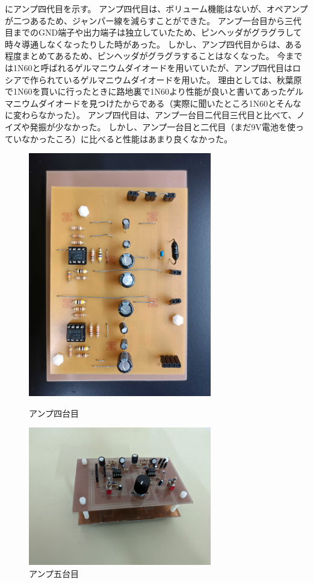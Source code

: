 \documentclass[report.tex]{subfiles}
\begin{document}
にアンプ四代目を示す。
アンプ四代目は、ボリューム機能はないが、オペアンプが二つあるため、ジャンパー線を減らすことができた。
アンプ一台目から三代目までのGND端子や出力端子は独立していたため、ピンヘッダがグラグラして時々導通しなくなったりした時があった。
しかし、アンプ四代目からは、ある程度まとめてあるため、ピンヘッダがグラグラすることはなくなった。
今までは1N60と呼ばれるゲルマニウムダイオードを用いていたが、アンプ四代目はロシアで作られているゲルマニウムダイオードを用いた。
理由としては、秋葉原で1N60を買いに行ったときに路地裏で1N60より性能が良いと書いてあったゲルマニウムダイオードを見つけたからである（実際に聞いたところ1N60とそんなに変わらなかった）。
アンプ四代目は、アンプ一台目二代目三代目と比べて、ノイズや発振が少なかった。
しかし、アンプ一台目と二代目（まだ9V電池を使っていなかったころ）に比べると性能はあまり良くなかった。


\begin{figure}[H]
	\begin{minipage}[b]{0.5\linewidth}
		\centering
		\includegraphics[width=8cm]{use/4.jpg}
		\caption{アンプ四台目}
		\label{fig:s_6}
	\end{minipage}
	\begin{minipage}[b]{0.5\linewidth}
		\centering
		\includegraphics[width=8cm]{use/amp.jpg}
		\caption{アンプ五台目}
		\label{fig:s_7}
	\end{minipage}
\end{figure}
\end{document}

